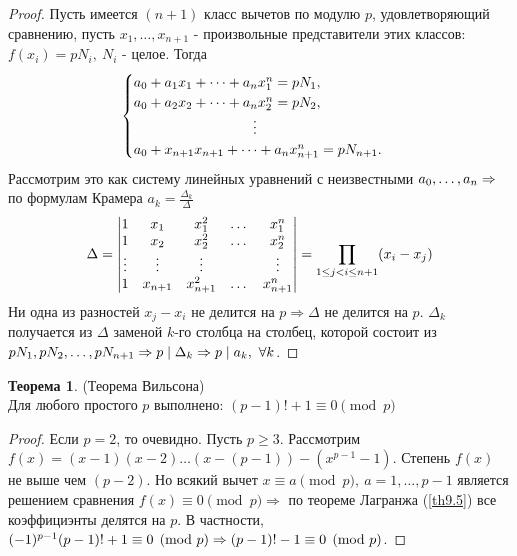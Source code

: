 \documentclass[a4paper, 12pt]{article}
\renewcommand{\div}{\mid}
\newcommand\tab[1][.5cm]{\hspace*{#1}}
\theoremstyle{definition}
\newtheorem{theorem}{Теорема}[section]
\begin{document}
    \begin{proof}
        Пусть имеется $(n+1)$ класс вычетов по модулю $p$, удовлетворяющий сравнению, пусть $x_1,\dots,x_{n+1}$ - произвольные представители этих классов: $f(x_i)=pN_i,\ N_i$ - целое. Тогда 
        \[\begin{cases}
            a_0+a_1 x_1+\dots+a_n x_1^n=pN_1,\\
            a_0+a_2 x_2+\dots+a_n x_2^n=pN_2,\\
            \tab[3cm]\vdots\\
            a_0+x_{n+1} x_{n+1}+\dots+a_n x_{n+1}^n=p N_{n+1}.
        \end{cases}\]
        Рассмотрим это как систему линейных уравнений с неизвестными $a_0,\dots, a_n\\
        \Rightarrow$ по формулам Крамера $a_k=\frac{\Delta_k}{\Delta}$
        \[\Delta=\begin{vmatrix}
            1 & x_1 & x_1^2 & \dots & x_1^n\\
            1 & x_2 & x_2^2 & \dots & x_2^n\\
            \vdots & \vdots & \vdots & \null & \vdots\\
            1 & x_{n+1} & x_{n+1}^2 & \dots & x_{n+1}^n
        \end{vmatrix} = \prod\limits_{1\leq j < i\leq n+1}(x_i-x_j)\]
        Ни одна из разностей $x_j-x_i$ не делится на $p \Rightarrow \Delta$ не делится на $p$. $\Delta_k$ получается из $\Delta$ заменой $k$-го столбца на столбец, которой состоит из $pN_1,pN_2,\dots,pN_{n+1}\\
        \Rightarrow p\div \Delta_k \Rightarrow p\div a_k,\ \forall k$.
    \end{proof} 
    \begin{theorem}(Теорема Вильсона)\label{th9.6} \\
        Для любого простого $p$ выполнено: $(p-1)!+1\equiv 0\pmod{p}$
    \end{theorem} 
    \begin{proof}
        Если $p=2$, то очевидно. Пусть $p\geq 3$. Рассмотрим\\
        $f(x)=(x-1)(x-2)\dots (x-(p-1))-(x^{p-1}-1)$. Степень $f(x)$ не выше чем $(p-2)$. Но всякий вычет $x\equiv a\pmod{p},\ a=1,\dots, p-1$ является решением сравнения $f(x)\equiv 0 \pmod{p} \Rightarrow$ по теореме Лагранжа (\ref{th9.5}) все коэффициэнты делятся на $p$. В частности, $(-1)^{p-1}(p-1)!+1\equiv 0\pmod{p}\\
        \Rightarrow (p-1)!-1\equiv0\pmod{p}$.
    \end{proof} 
\end{document}
